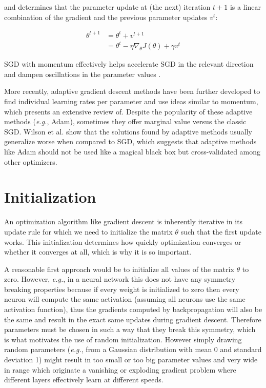 and determines that the parameter update at (the next) iteration $t+1$ is a linear combination of the gradient and the previous parameter updates $v^{t}$:

\begin{align*}
    \theta^{t+1} &= \theta^{t} + v^{t+1} \\
                 &= \theta^{t} - \eta \nabla_{\theta} J(\theta) + \gamma v^{t}
\end{align*}

\ac{SGD} with momentum effectively helps accelerate \ac{SGD} in the relevant direction and dampen oscillations in the parameter values \cite{ruder2016}.

More recently, adaptive gradient descent methods have been further developed to find individual learning rates per parameter and use ideas similar to momentum, which \citeauthor{ruder2016} \cite{ruder2016} presents an extensive review of. Despite the popularity of these adaptive methods (\textit{e.g.}, Adam), sometimes they offer marginal value versus the classic \ac{SGD}. Wilson et al. \cite{wilson2017} show that the solutions found by adaptive methods usually generalize worse when compared to \ac{SGD}, which suggests that adaptive methods like Adam should not be used like a magical black box but cross-validated among other optimizers.

\section{Initialization}

An optimization algorithm like gradient descent is inherently iterative in its update rule for which we need to initialize the matrix $\theta$ such that the first update works. This initialization determines how quickly optimization converges or whether it converges at all, which is why it is so important.

A reasonable first approach would be to initialize all values of the matrix $\theta$ to zero. However, \textit{e.g.}, in a neural network this does not have any symmetry breaking properties because if every weight is initialized to zero then every neuron will compute the same activation (assuming all neurons use the same activation function), thus the gradients computed by backpropagation will also be the same and result in the exact same updates during gradient descent. Therefore parameters must be chosen in such a way that they break this symmetry, which is what motivates the use of random initialization. However simply drawing random parameters (\textit{e.g.}, from a Gaussian distribution with mean 0 and standard deviation 1) might result in too small or too big parameter values and very wide in range which originate a vanishing or exploding gradient problem where different layers effectively learn at different speeds.

